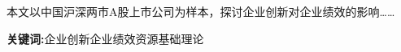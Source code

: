 \begin{cnabstract}

    本文以中国沪深两市A股上市公司为样本，探讨企业创新对企业绩效的影响……
    
    \par\textbf{关键词:}企业创新\hspace{1em}企业绩效\hspace{1em}资源基础理论
\end{cnabstract}
